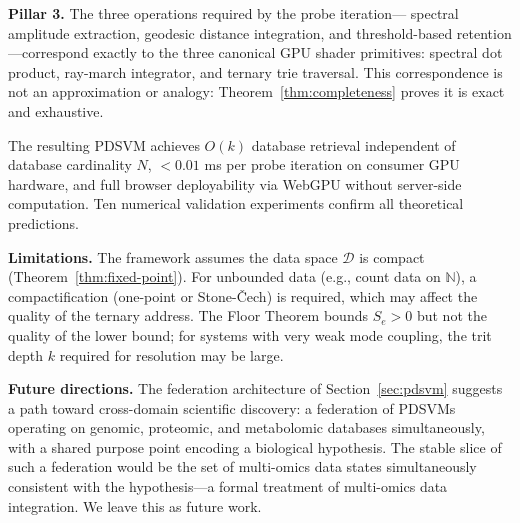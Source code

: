 \documentclass[10pt,twocolumn]{article}
\newcommand{\N}{\mathbb{N}}
\newcommand{\DataSpace}{\mathcal{D}}
\begin{document}
\textbf{Pillar 3.} The three operations required by the probe iteration---
spectral amplitude extraction, geodesic distance integration, and
threshold-based retention---correspond exactly to the three canonical
GPU shader primitives: spectral dot product, ray-march integrator,
and ternary trie traversal.
This correspondence is not an approximation or analogy:
Theorem~\ref{thm:completeness} proves it is exact and exhaustive.

The resulting PDSVM achieves $O(k)$ database retrieval independent of
database cardinality $N$, $< 0.01$ ms per probe iteration on consumer GPU hardware,
and full browser deployability via WebGPU without server-side computation.
Ten numerical validation experiments confirm all theoretical predictions.

\textbf{Limitations.}
The framework assumes the data space $\DataSpace$ is compact (Theorem~\ref{thm:fixed-point}).
For unbounded data (e.g., count data on $\N$), a compactification
(one-point or Stone-\v{C}ech) is required, which may affect the quality
of the ternary address.
The Floor Theorem bounds $S_e > 0$ but not the quality of the lower bound;
for systems with very weak mode coupling, the trit depth $k$ required
for resolution may be large.

\textbf{Future directions.}
The federation architecture of Section~\ref{sec:pdsvm} suggests a path toward
cross-domain scientific discovery: a federation of PDSVMs operating on
genomic, proteomic, and metabolomic databases simultaneously,
with a shared purpose point encoding a biological hypothesis.
The stable slice of such a federation would be the set of multi-omics
data states simultaneously consistent with the hypothesis---a formal
treatment of multi-omics data integration.
We leave this as future work.



\end{document}
